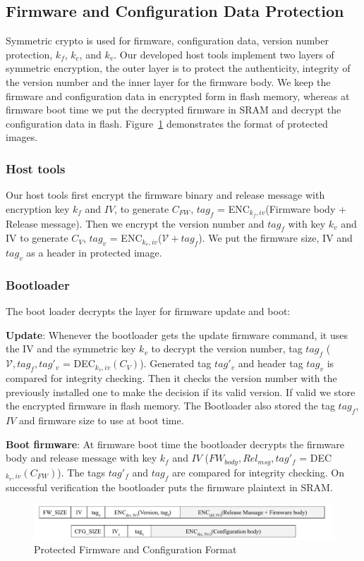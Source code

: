 \documentclass[11pt,oneside,onecolumn,letterpaper]{article}
\begin{document}
\subsection{Firmware and Configuration Data Protection}
Symmetric crypto is used for firmware, configuration data, version number protection, $k_f$, $k_c$, and $k_v$.
Our developed host tools implement two layers of symmetric encryption, the outer layer is to protect the authenticity, integrity of the version number and the inner layer for the firmware body.
We keep the firmware and configuration data in encrypted form in flash memory, whereas at firmware boot time we put the decrypted firmware in SRAM and decrypt the configuration data in flash.
Figure~\ref{fig:frmt} demonstrates the format of protected images.
\subsubsection{Host tools}
Our host tools first encrypt the firmware binary and release message with encryption key $k_f$ and $IV$, to generate $C_{FW}$, $tag_f$ = ENC$_{k_f, iv}$(Firmware body + Release message).
Then we encrypt the version number and $tag_f$ with key $k_v$ and IV to generate $C_V$, $tag_v$ = ENC$_{k_v, iv}$($\mathcal{V} + tag_f$).
We put the firmware size, IV and $tag_v$ as a header in protected image.

\subsubsection{Bootloader}

The boot loader decrypts the layer for firmware update and boot:

\textbf{Update}: Whenever the bootloader gets the update firmware command, it uses the IV and the symmetric key $k_v$ to decrypt the version number, tag $tag_f$ ($\mathcal{V}, tag_f, tag'_v$ = DEC$_{k_v, iv}(C_V)$).
Generated tag $tag'_v$ and header tag $tag_v$ is compared for integrity checking.
Then it checks the version number with the previously installed one to make the decision if its valid version.
If valid we store the encrypted firmware in flash memory.
The Bootloader also stored the tag $tag_f$, $IV$ and firmware size to use at boot time.

\textbf{Boot firmware}: At firmware boot time the bootloader decrypts the firmware body and release message with key $k_f$ and $IV$ ($FW_{body}, Rel_{msg}, tag'_f$ = DEC$_{k_v, iv}(C_{FW})$).
The tags $tag'_f$ and $tag_f$ are compared for integrity checking.
On successful verification the bootloader puts the firmware plaintext in SRAM.
\begin{figure}[!htbp]
	\begin{centering}
		\includegraphics[width = .80\textwidth]{pic/FW_CFG_FORMAT.pdf}
		\caption{Protected Firmware and Configuration Format}
		\label{fig:frmt}
	\end{centering}
\end{figure}
\end{document}

